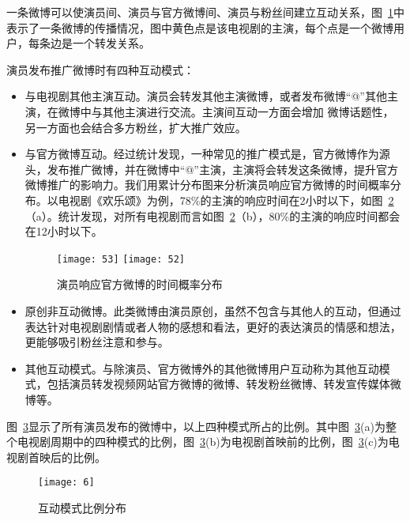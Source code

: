 一条微博可以使演员间、演员与官方微博间、演员与粉丝间建立互动关系，图~\ref{inter}中表示了一条微博的传播情况，图中黄色点是该电视剧的主演，每个点是一个微博用户，每条边是一个转发关系。

演员发布推广微博时有四种互动模式：
\begin{itemize}

\begin{figure}[H]
\centering
\texttt{[image: 微博互动]}
\caption{微博互动关系}
\label{inter}
\end{figure}

\item[（1）]与电视剧其他主演互动。演员会转发其他主演微博，或者发布微博“@”其他主演，在微博中与其他主演进行交流。主演间互动一方面会增加 微博话题性，另一方面也会结合多方粉丝，扩大推广效应。

\item[（2）]与官方微博互动。经过统计发现，一种常见的推广模式是，官方微博作为源头，发布推广微博，并在微博中“@”主演，主演将会转发这条微博，提升官方微博推广的影响力。我们用累计分布图来分析演员响应官方微博的时间概率分布。以电视剧《欢乐颂》为例，78\%的主演的响应时间在2小时以下，如图~\ref{fig}（a）。统计发现，对所有电视剧而言如图~\ref{fig}（b），80\%的主演的响应时间都会在12小时以下。

\begin{figure}[h]
  \centering%
    {\texttt{[image: 53]}}
      {\texttt{[image: 52]}}
  \caption{演员响应官方微博的时间概率分布}
  \label{fig}
\end{figure}

\item[（3）]原创非互动微博。此类微博由演员原创，虽然不包含与其他人的互动，但通过表达针对电视剧剧情或者人物的感想和看法，更好的表达演员的情感和想法，更能够吸引粉丝注意和参与。

\item[（4）]其他互动模式。与除演员、官方微博外的其他微博用户互动称为其他互动模式，包括演员转发视频网站官方微博的微博、转发粉丝微博、转发宣传媒体微博等。

\end{itemize}

图~\ref{inter3}显示了所有演员发布的微博中，以上四种模式所占的比例。其中图~\ref{inter3}(a)为整个电视剧周期中的四种模式的比例，图~\ref{inter3}(b)为电视剧首映前的比例，图~\ref{inter3}(c)为电视剧首映后的比例。

\begin{figure}[!htbp]
\centering
\texttt{[image: 6]}
\caption{互动模式比例分布}
\label{inter3}
\end{figure}

